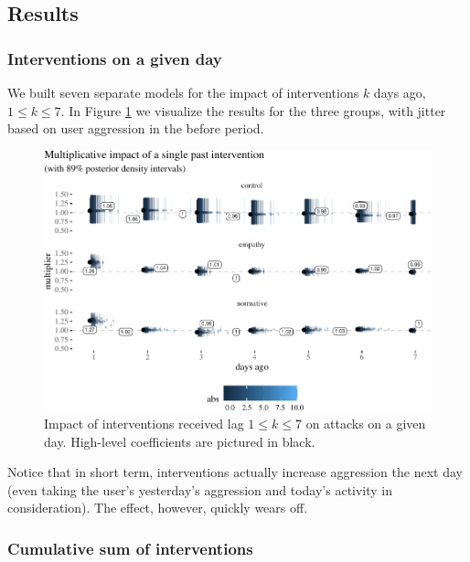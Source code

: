 \documentclass[preprint,12pt]{elsarticle}
\begin{document}
\subsection{Results}\label{subsec:resultss}


\subsubsection{Interventions on a given
day}\label{subsubsec:interventions-on-a-given-day}




We built seven separate models for the impact of interventions \(k\)
days ago, \(1\leq k \leq 7\). In Figure \ref{fig:dailyResults} we
visualize the results for the three groups, with jitter based on user
aggression in the before period.


\begin{figure}

\begin{center}\includegraphics[width=1\linewidth]{ figures/fig:dailyResultsPlot-1} \end{center}
\caption{Impact of interventions received lag $1\leq k \leq 7$ on attacks on a given day. High-level coefficients are pictured in black.}
\label{fig:dailyResults}
\end{figure}

Notice that in short term, interventions actually increase aggression
the next day (even taking the user's yesterday's aggression and today's
activity in consideration). The effect, however, quickly wears off.


\subsubsection{Cumulative sum of
interventions}\label{subsubsec:cumulative-sum-of-interventions}
\end{document}
